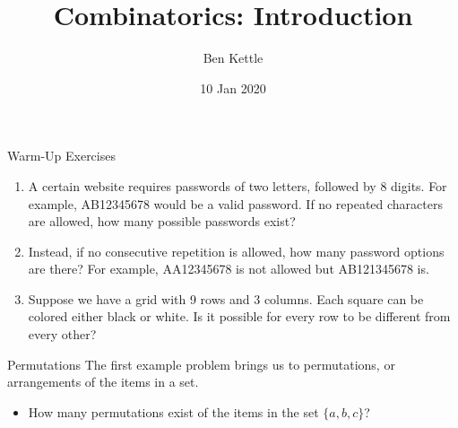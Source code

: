 \documentclass{beamer}
\title{Combinatorics: Introduction}
\author{Ben Kettle}
\date{10 Jan 2020}
\begin{document}
 
\frame{\titlepage}
 
\begin{frame}{Warm-Up Exercises}
\begin{enumerate}
    
    \item A certain website requires passwords of two letters, followed by 8 digits. For example, AB12345678 would be a valid password. If no repeated characters are allowed, how many possible passwords exist?
    
    \item Instead, if no consecutive repetition is allowed, how many password options are there? For example, AA12345678 is not allowed but AB121345678 is.
    
    \item Suppose we have a grid with 9 rows and 3 columns. Each square can be colored either black or white. Is it possible for every row to be different from every other?
    
\end{enumerate}
\end{frame}

\begin{frame}{Permutations}
    The first example problem brings us to \alert{permutations}, or arrangements of the items in a set. 
    
    \begin{itemize}
        \item How many permutations exist of the items in the set $\{a, b, c\}$?
    \end{itemize}
    
\end{frame}
\end{document}
